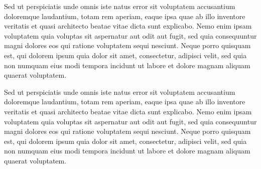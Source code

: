 Sed ut perspiciatis unde omnis iste natus error sit voluptatem accusantium doloremque laudantium, totam rem aperiam, eaque ipsa quae ab illo inventore veritatis et quasi architecto beatae vitae dicta sunt explicabo. Nemo enim ipsam voluptatem quia voluptas sit aspernatur aut odit aut fugit, sed quia consequuntur magni dolores eos qui ratione voluptatem sequi nesciunt. Neque porro quisquam est, qui dolorem ipsum quia dolor sit amet, consectetur, adipisci velit, sed quia non numquam eius modi tempora incidunt ut labore et dolore magnam aliquam quaerat voluptatem.


Sed ut perspiciatis unde omnis iste natus error sit voluptatem accusantium doloremque laudantium, totam rem aperiam, eaque ipsa quae ab illo inventore veritatis et quasi architecto beatae vitae dicta sunt explicabo. Nemo enim ipsam voluptatem quia voluptas sit aspernatur aut odit aut fugit, sed quia consequuntur magni dolores eos qui ratione voluptatem sequi nesciunt. Neque porro quisquam est, qui dolorem ipsum quia dolor sit amet, consectetur, adipisci velit, sed quia non numquam eius modi tempora incidunt ut labore et dolore magnam aliquam quaerat voluptatem.








